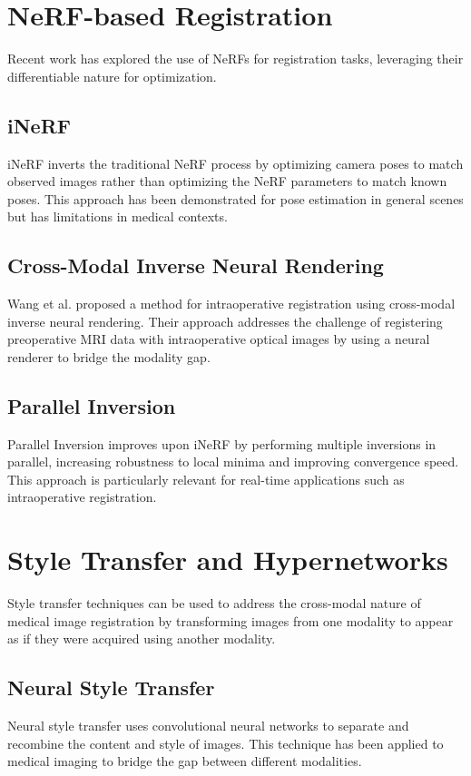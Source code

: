 \section{NeRF-based Registration}
Recent work has explored the use of NeRFs for registration tasks, leveraging their differentiable nature for optimization.

\subsection{iNeRF}
iNeRF \cite{yen2021inerf} inverts the traditional NeRF process by optimizing camera poses to match observed images rather than optimizing the NeRF parameters to match known poses. This approach has been demonstrated for pose estimation in general scenes but has limitations in medical contexts.

\subsection{Cross-Modal Inverse Neural Rendering}
Wang et al. \cite{wang2021cross} proposed a method for intraoperative registration using cross-modal inverse neural rendering. Their approach addresses the challenge of registering preoperative MRI data with intraoperative optical images by using a neural renderer to bridge the modality gap.

\subsection{Parallel Inversion}
Parallel Inversion \cite{wang2021parallel} improves upon iNeRF by performing multiple inversions in parallel, increasing robustness to local minima and improving convergence speed. This approach is particularly relevant for real-time applications such as intraoperative registration.

\section{Style Transfer and Hypernetworks}
Style transfer techniques can be used to address the cross-modal nature of medical image registration by transforming images from one modality to appear as if they were acquired using another modality.

\subsection{Neural Style Transfer}
Neural style transfer \cite{gatys2016image} uses convolutional neural networks to separate and recombine the content and style of images. This technique has been applied to medical imaging to bridge the gap between different modalities.

